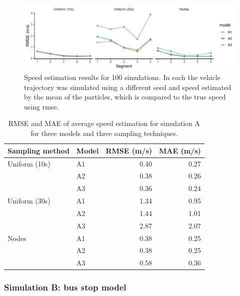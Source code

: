 \begin{knitrout}\small
{}\color{fgcolor}\begin{figure}
\includegraphics[width=\linewidth]{figure/sim1_pf_full-1} \caption[Results for simulation A replicated 100~times]{Speed estimation results for 100 simulations. In each the vehicle trajectory was simulated using a different seed and speed estimated by the mean of the particles, which is compared to the true speed using \gls{rmse}.}\label{fig:sim1_pf_full}
\end{figure}

\begin{table}

\caption{\label{tab:sim1_pf_full}RMSE and MAE of average speed estimation for simulation A for three models and three sampling techniques.}
\centering
\fontsize{8}{10}\selectfont
\begin{tabular}[t]{llrr}
\toprule
Sampling method & Model & RMSE (m/s) & MAE (m/s)\\
\midrule
Uniform (10s) & A1 & 0.40 & 0.27\\
 & A2 & 0.38 & 0.26\\
 & A3 & 0.36 & 0.24\\
\midrule
Uniform (30s) & A1 & 1.34 & 0.95\\
 & A2 & 1.44 & 1.01\\
 & A3 & 2.87 & 2.07\\
\midrule
Nodes & A1 & 0.38 & 0.25\\
 & A2 & 0.38 & 0.25\\
 & A3 & 0.58 & 0.36\\
\bottomrule
\end{tabular}
\end{table}


\end{knitrout}



\subsubsection{Simulation B: bus stop model}
\label{sec:vehicle_sim_B}

